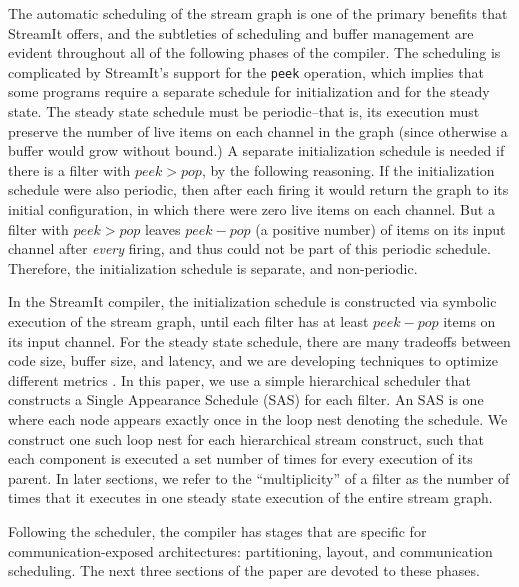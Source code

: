 The automatic scheduling of the stream graph is one of the primary
benefits that StreamIt offers, and the subtleties of scheduling and
buffer management are evident throughout all of the following phases
of the compiler.  The scheduling is complicated by StreamIt's support
for the {\tt peek} operation, which implies that some programs require
a separate schedule for initialization and for the steady state.  The
steady state schedule must be periodic--that is, its execution must
preserve the number of live items on each channel in the graph (since
otherwise a buffer would grow without bound.)  A separate
initialization schedule is needed if there is a filter with $peek >
pop$, by the following reasoning.  If the initialization schedule were
also periodic, then after each firing it would return the graph to its
initial configuration, in which there were zero live items on each
channel.  But a filter with $peek > pop$ leaves $peek-pop$ (a positive
number) of items on its input channel after {\it every} firing, and
thus could not be part of this periodic schedule.  Therefore, the
initialization schedule is separate, and non-periodic.

In the StreamIt compiler, the initialization schedule is constructed
via symbolic execution of the stream graph, until each filter has at
least $peek-pop$ items on its input channel.  For the steady state
schedule, there are many tradeoffs between code size, buffer size, and
latency, and we are developing techniques to optimize different
metrics \cite{streamittech2}.  In this paper, we use a simple
hierarchical scheduler that constructs a Single Appearance Schedule
(SAS) \cite{leesdf} for each filter.  An SAS is one where each node
appears exactly once in the loop nest denoting the schedule.  We
construct one such loop nest for each hierarchical stream construct,
such that each component is executed a set number of times for every
execution of its parent.  In later sections, we refer to the
``multiplicity'' of a filter as the number of times that it executes
in one steady state execution of the entire stream graph.

Following the scheduler, the compiler has stages that are specific for
communication-exposed architectures: partitioning, layout, and
communication scheduling.  The next three sections of the paper are
devoted to these phases.



